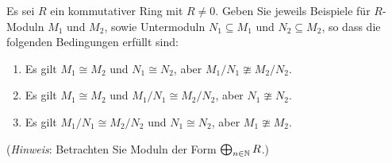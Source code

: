

\begin{question}
  Es sei $R$ ein kommutativer Ring mit $R \neq 0$.
  Geben Sie jeweils Beispiele für $R$-Moduln $M_1$ und $M_2$, sowie Untermoduln $N_1 \subseteq M_1$ und $N_2 \subseteq M_2$, so dass die folgenden Bedingungen erfüllt sind:
  \begin{enumerate}
    \item
      Es gilt $M_1 \cong M_2$ und $N_1 \cong N_2$, aber $M_1/N_1 \ncong M_2/N_2$.
    \item
      Es gilt $M_1 \cong M_2$ und $M_1/N_1 \cong M_2/N_2$, aber $N_1 \ncong N_2$.
    \item
      Es gilt $M_1/N_1 \cong M_2/N_2$ und $N_1 \cong N_2$, aber $M_1 \ncong M_2$.
  \end{enumerate}
  (\emph{Hinweis}:
   Betrachten Sie Moduln der Form $\bigoplus_{n \in \mathbb{N}} R$.)
\end{question}




